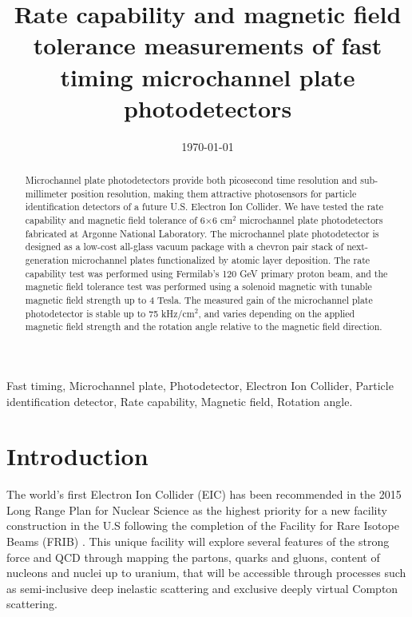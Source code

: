 \documentclass[preprint,5p]{elsarticle}
\title{\vspace{-15mm}\fontsize{18pt}{10pt}\selectfont\textbf{Rate capability 
and magnetic field tolerance measurements of fast timing microchannel plate 
photodetectors}}
\date{\today}
\begin{document}
\begin{abstract}
Microchannel plate photodetectors provide both picosecond time resolution and 
sub-millimeter position resolution, making them attractive photosensors for 
particle identification detectors of a future U.S. Electron Ion Collider. We 
have tested the rate capability and magnetic field tolerance of 6$\times$6 
cm$^{2}$ microchannel plate photodetectors fabricated at Argonne National 
Laboratory. The microchannel plate photodetector is designed as a low-cost 
all-glass vacuum package with a chevron pair stack of next-generation 
microchannel plates functionalized by atomic layer deposition. The rate 
capability test was performed using Fermilab's 120 GeV primary proton beam, and 
the magnetic field tolerance test was performed using a solenoid magnetic with 
tunable magnetic field strength up to 4 Tesla. The measured gain of the 
microchannel plate photodetector is stable up to 75 kHz/cm$^{2}$, and varies 
depending on the applied magnetic field strength and the rotation angle 
relative to the magnetic field direction.
\end{abstract}

\maketitle

\begin{keywords}
   Fast timing, Microchannel plate, Photodetector, Electron Ion Collider, 
   Particle identification detector, Rate capability, Magnetic field, Rotation 
   angle.
\end{keywords}


\section{Introduction} \label{sec:level1}
The world's first Electron Ion Collider (EIC) \cite{EIC} has been recommended
in the 2015 Long Range Plan for Nuclear Science as the highest priority for a 
new facility construction in the U.S following the completion of the Facility 
for Rare Isotope Beams (FRIB) \cite{LRP}. This unique facility will explore 
several features of the strong force and QCD through mapping the partons, 
quarks and gluons, content of nucleons and nuclei up to uranium, that will be 
accessible through processes such as semi-inclusive deep inelastic scattering 
and exclusive deeply virtual Compton scattering.  
\end{document}
